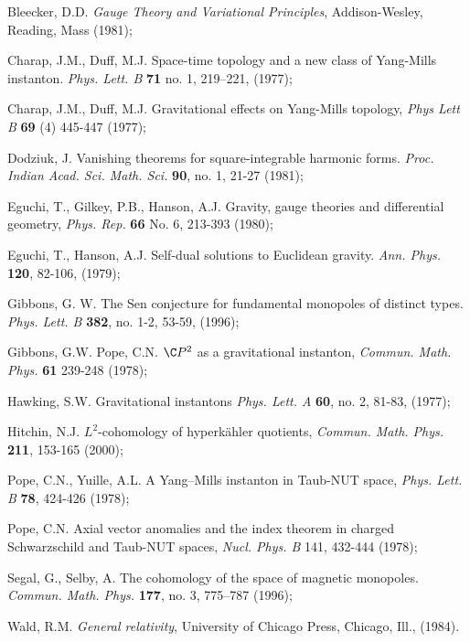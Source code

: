 \documentclass[a4paper,12pt,draft]{article}
\begin{document}
\begin{thebibliography}{Z}

 Bleecker, D.D. {\it Gauge Theory and Variational
Principles}, Addison-Wesley, Reading, Mass (1981);

 Charap, J.M., Duff, M.J. 
Space-time topology and a new class of Yang-Mills instanton. 
{\em Phys. Lett. B} {\bf 71} no. 1, 219--221, (1977); 

 Charap, J.M., Duff, M.J.  
    Gravitational effects on Yang-Mills topology,
    {\em Phys Lett B} {\bf 69} (4) 445-447 (1977); 

Dodziuk, J. Vanishing theorems for square-integrable harmonic forms. 
{\em Proc. Indian Acad. Sci. Math. Sci.} {\bf 90}, no. 1, 21-27 (1981);

 Eguchi, T., Gilkey, P.B., Hanson, A.J. Gravity,
gauge theories and differential geometry, {\it Phys. Rep.} {\bf 66} No. 6,
213-393 (1980);

 Eguchi, T., Hanson, A.J. Self-dual solutions to
Euclidean gravity. {\em Ann. Phys.} {\bf 120}, 82-106, (1979);

Gibbons, G. W.
The Sen conjecture for fundamental monopoles of distinct types. 
{\em Phys. Lett. B} {\bf 382}, no. 1-2, 53-59, (1996);

Gibbons, G.W. Pope, C.N. $\C P^2$ as a gravitational
instanton, {\it Commun. Math. Phys.} {\bf 61} 239-248 (1978);

 Hawking, S.W. Gravitational instantons {\em Phys. 
Lett. A} {\bf 60},  no. 2, 81-83, (1977);

 Hitchin, N.J.  $L^2$-cohomology of hyperk\"ahler
quotients, {\em Commun. Math. Phys.} {\bf 211}, 153-165 (2000);

Pope, C.N., Yuille, A.L. A Yang--Mills instanton in
Taub-NUT space, {\it Phys. Lett. B} {\bf 78}, 424-426 (1978);

Pope, C.N. Axial vector anomalies and the index theorem in
charged Schwarzschild and Taub-NUT spaces, {\it Nucl. Phys. B} {141},
432-444 (1978); 

 Segal, G., Selby, A. 
The cohomology of the space of magnetic monopoles. 
{\it Commun. Math. Phys.} {\bf 177}, no. 3,
775--787 (1996);


 Wald, R.M. {\em General relativity}, 
University of Chicago Press, Chicago, Ill., (1984).

\end{thebibliography}
\end{document}
